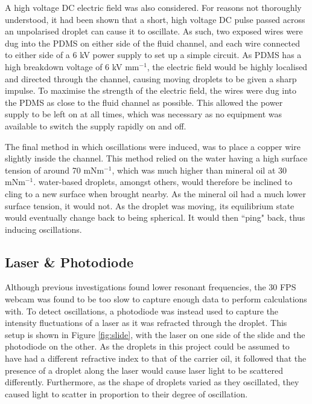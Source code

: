 \documentclass{physics_article_B}
\begin{document}
        A high voltage DC electric field was also considered. For reasons not thoroughly understood, it had been shown that a short, high voltage DC pulse passed across an unpolarised droplet can cause it to oscillate\cite{DCfield}. As such, two exposed wires were dug into the PDMS on either side of the fluid channel, and each wire connected to either side of a 6 kV power supply to set up a simple circuit. As PDMS has a high breakdown voltage of\cite{PDMSBreakdown} 6 kV mm$^{-1}$, the electric field would be highly localised and directed through the channel, causing moving droplets to be given a sharp impulse. To maximise the strength of the electric field, the wires were dug into the PDMS as close to the fluid channel as possible. This allowed the power supply to be left on at all times, which was necessary as no equipment was available to switch the supply rapidly on and off. 
        
        The final method in which oscillations were induced, was to place a copper wire slightly inside the channel. This method relied on the water having a high surface tension of around 70 mNm$^{-1}$, which was much higher than mineral oil at 30 mNm$^{-1}$. water-based droplets, amongst others, would therefore be inclined to cling to a new surface when brought nearby. As the mineral oil had a much lower surface tension, it would not. As the droplet was moving, its equilibrium state would eventually change back to being spherical. It would then ``ping" back, thus inducing oscillations. 
        
    \subsection{Laser \& Photodiode\label{sect:method:laser}}
    
        Although previous investigations found lower resonant frequencies\cite{Temperton2012}, the 30 FPS webcam was found to be too slow to capture enough data to perform calculations with. To detect oscillations, a photodiode was instead used to capture the intensity fluctuations of a laser as it was refracted through the droplet. This setup is shown in Figure \ref{fig:slide}, with the laser on one side of the slide and the photodiode on the other. As the droplets in this project could be assumed to have had a different refractive index to that of the carrier oil\cite{viscosity1,viscosity2}, it followed that the presence of a droplet along the laser would cause laser light to be scattered differently. Furthermore, as the shape of droplets varied as they oscillated, they caused light to scatter in proportion to their degree of oscillation. 
        
\end{document}
